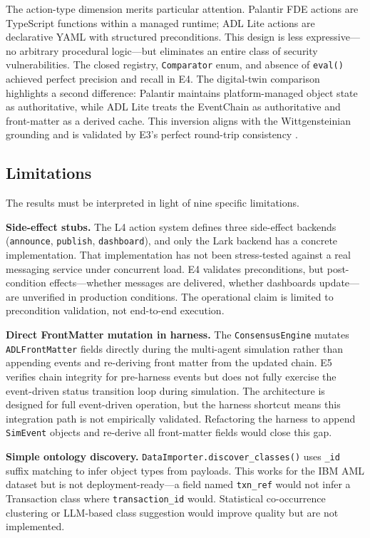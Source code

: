 The action-type dimension merits particular attention. Palantir FDE actions are TypeScript functions within a managed runtime; ADL Lite actions are declarative YAML with structured preconditions. This design is less expressive---no arbitrary procedural logic---but eliminates an entire class of security vulnerabilities. The closed registry, \texttt{Comparator} enum, and absence of \texttt{eval()} achieved perfect precision and recall in E4. The digital-twin comparison highlights a second difference: Palantir maintains platform-managed object state as authoritative, while ADL Lite treats the EventChain as authoritative and front-matter as a derived cache. This inversion aligns with the Wittgensteinian grounding and is validated by E3's perfect round-trip consistency \cite{ref9}\cite{ref11}.

\subsection{Limitations}\label{limitations}

The results must be interpreted in light of nine specific limitations.

\textbf{Side-effect stubs.} The L4 action system defines three side-effect backends (\texttt{announce}, \texttt{publish}, \texttt{dashboard}), and only the Lark backend has a concrete implementation. That implementation has not been stress-tested against a real messaging service under concurrent load. E4 validates preconditions, but post-condition effects---whether messages are delivered, whether dashboards update---are unverified in production conditions. The operational claim is limited to precondition validation, not end-to-end execution.

\textbf{Direct FrontMatter mutation in harness.} The \texttt{ConsensusEngine} mutates \texttt{ADLFrontMatter} fields directly during the multi-agent simulation rather than appending events and re-deriving front matter from the updated chain. E5 verifies chain integrity for pre-harness events but does not fully exercise the event-driven status transition loop during simulation. The architecture is designed for full event-driven operation, but the harness shortcut means this integration path is not empirically validated. Refactoring the harness to append \texttt{SimEvent} objects and re-derive all front-matter fields would close this gap.

\textbf{Simple ontology discovery.} \texttt{DataImporter.discover\_classes()} uses \texttt{\_id} suffix matching to infer object types from payloads. This works for the IBM AML dataset but is not deployment-ready---a field named \texttt{txn\_ref} would not infer a Transaction class where \texttt{transaction\_id} would. Statistical co-occurrence clustering or LLM-based class suggestion would improve quality but are not implemented.

